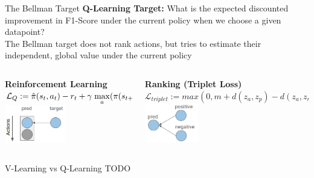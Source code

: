 \documentclass[aspectratio=169, 11pt, invertlogo]{ismll-slides}
\begin{document}
\begin{frame}[fragile]{The Bellman Target}
	\textbf{Q-Learning Target:}
	What is the expected discounted improvement in F1-Score under the current policy when we choose a given datapoint? \\ [2mm]
	The Bellman target does not rank actions, but tries to estimate their independent, global value under the current policy
	\vspace{5mm}
	\begin{columns}
		\begin{column}{.42\linewidth}
			\textbf{Reinforcement Learning} \\ 
			$\mathcal{L}_Q := \hat{\pi}(s_t, a_t) - r_t + \gamma \hspace{1mm} \underset{a}{\operatorname{max}}(\pi(s_{t+1}))$ \\
			\includegraphics[width=100px]{pics/bellman}
		\end{column}
		\hspace{1mm}
		\begin{column}{.55\linewidth}
			\textbf{Ranking (Triplet Loss)} \\ 
			$\mathcal{L}_{triplet} := max(0, m+d(z_a, z_p) - d(z_a, z_n))$ \\
			\includegraphics[width=88px]{pics/triplet}
		\end{column}
	\end{columns}
\end{frame}



\begin{frame}[fragile]{V-Learning vs Q-Learning}
	TODO
\end{frame}

\end{document}

